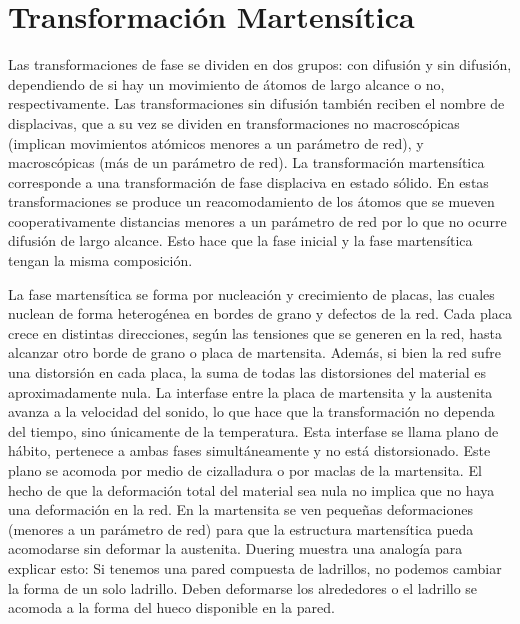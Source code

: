 \documentclass[a4paper,12pt,fleqn,twoside,openany]{book}
\begin{document}
\section{Transformación Martensítica}

Las transformaciones de fase se dividen en dos grupos:  con difusión y sin difusión, dependiendo de si hay un movimiento de átomos de largo alcance o no,
respectivamente. Las transformaciones sin difusión también reciben el nombre de displacivas, que a su vez se dividen en transformaciones no macroscópicas
(implican movimientos atómicos menores a un parámetro de red), y macroscópicas (más de un parámetro de red).
La transformación martensítica corresponde a una transformación de fase displaciva en estado sólido. En estas transformaciones se produce un reacomodamiento de los átomos que se mueven cooperativamente distancias menores a un parámetro de red 
por lo que no ocurre difusión de largo alcance. Esto hace que la fase inicial y la fase martensítica tengan la misma composición. 



La fase martensítica se forma por nucleación y crecimiento de placas, las cuales nuclean de forma heterogénea en bordes de grano y defectos de la red. 
Cada placa crece en distintas direcciones, según las tensiones que se generen en la red, hasta alcanzar otro borde de grano o placa de martensita. 
Además, si bien la red sufre una distorsión en cada placa, la suma de todas las distorsiones del material es aproximadamente nula. 
La interfase entre la placa de martensita y la austenita avanza a la velocidad del sonido, lo que hace que la transformación no dependa del 
tiempo, sino únicamente de la temperatura. Esta interfase se llama plano de hábito, pertenece a ambas fases 
simultáneamente y no está distorsionado. Este plano se acomoda por medio de cizalladura o por maclas de la martensita. 
El hecho de que la deformación total del material sea nula no implica que no haya una deformación en la red. En la martensita se ven pequeñas 
deformaciones (menores a un parámetro de red) para que la estructura martensítica pueda acomodarse sin deformar la austenita. 
Duering \cite{duering} muestra una analogía para explicar esto: Si tenemos una pared compuesta de ladrillos, no podemos cambiar la forma de un solo ladrillo. 
Deben deformarse los alrededores o el ladrillo se acomoda a la forma del hueco disponible en la pared.
\end{document}
